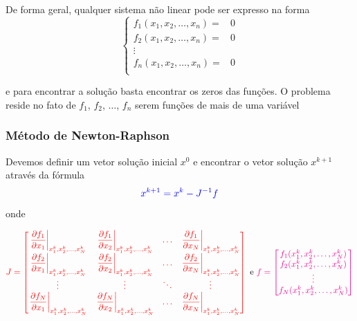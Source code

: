 \begin{frame}[c]
De forma geral, qualquer sistema não linear pode ser expresso na forma
\[
\begin{cases}
f_1(x_1, x_2, \ldots, x_n) =& 0 \\
f_2(x_1, x_2, \ldots, x_n) =& 0 \\
                         \vdots & \\
f_n(x_1, x_2, \ldots, x_n) =& 0 \\                           
\end{cases}
\]

e para encontrar a solução basta encontrar os zeros das funções. O problema reside no fato de $f_1$, $f_2$, $\ldots$, $f_n$ serem funções de mais de uma variável
\end{frame}

\begin{frame}
\frametitle{Método de Newton-Raphson}
Devemos definir um vetor solução inicial $x^0$ e encontrar o vetor solução $x^{k+1}$ através da fórmula
\[
\color{blue} 
x^{k+1}=x^k-J^{-1} f
\]
onde

\[
\color{red}
J=
\begin{bmatrix}
\left. \dfrac{\partial f_1}{\partial x_1}\right|_{x_1^k,x_2^k,\ldots,x^k_N} &
\left. \dfrac{\partial f_1}{\partial x_2}\right|_{x_1^k,x_2^k,\ldots,x^k_N} & \ldots &
\left. \dfrac{\partial f_1}{\partial x_N}\right|_{x_1^k,x_2^k,\ldots,x^k_N} \\
\left. \dfrac{\partial f_2}{\partial x_1}\right|_{x_1^k,x_2^k,\ldots,x^k_N} &
\left. \dfrac{\partial f_2}{\partial x_2}\right|_{x_1^k,x_2^k,\ldots,x^k_N} & \ldots &
\left. \dfrac{\partial f_2}{\partial x_N}\right|_{x_1^k,x_2^k,\ldots,x^k_N} \\
\vdots & \vdots & \ddots & \vdots \\
\left. \dfrac{\partial f_N}{\partial x_1}\right|_{x_1^k,x_2^k,\ldots,x^k_N} &
\left. \dfrac{\partial f_N}{\partial x_2}\right|_{x_1^k,x_2^k,\ldots,x^k_N} & \ldots &
\left. \dfrac{\partial f_N}{\partial x_N}\right|_{x_1^k,x_2^k,\ldots,x^k_N}
\end{bmatrix}
\color{black}
\text{ e }
\color{magenta}
f=
\begin{bmatrix}
f_1(x_1^k,x_2^k,\ldots,x^k_N) \\
f_2(x_1^k,x_2^k,\ldots,x^k_N) \\ \vdots \\
f_N(x_1^k,x_2^k,\ldots,x^k_N)
\end{bmatrix}
\]

\end{frame}

